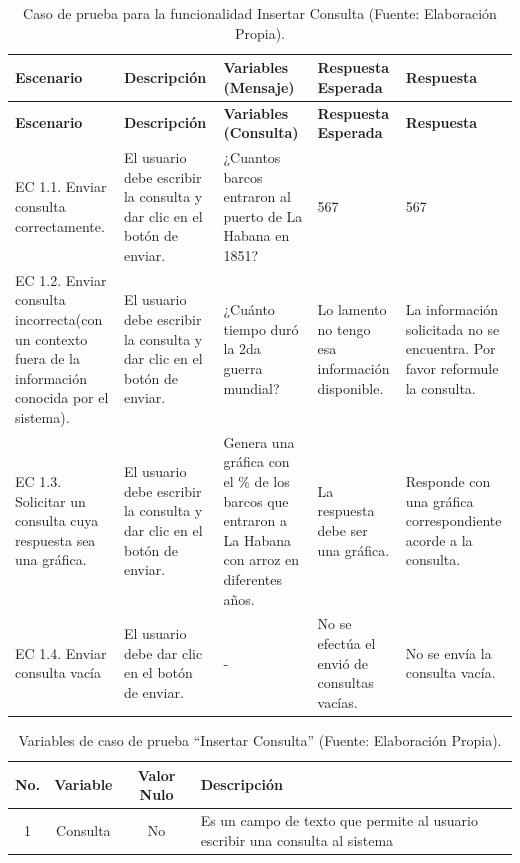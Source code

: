 \begin{small} 
	\begin{longtable}{|p{2.2cm}|p{3cm}|p{3.2cm}|p{3.2cm}|p{3.2cm}|}
		\caption{Caso de prueba para la funcionalidad Insertar Consulta (Fuente: Elaboración Propia).} \label{tab:caso_prueba_enviar_consulta} \\
		\hline
		\textbf{Escenario} & \textbf{Descripción} & \textbf{Variables (Mensaje)} & \textbf{Respuesta Esperada} & \textbf{Respuesta} \\
		\hline
		\endfirsthead
		
		\hline
		\textbf{Escenario} & \textbf{Descripción} & \textbf{Variables (Consulta)} & \textbf{Respuesta Esperada} & \textbf{Respuesta} \\
		\hline
		\endhead
		
		\hline
		\endfoot
		
		\hline
		\endlastfoot
		
		EC 1.1. Enviar consulta correctamente. & El usuario debe escribir la consulta y dar clic en el botón de enviar. & ¿Cuantos barcos entraron al puerto de La Habana en 1851? & 567 & 567 \\
		\hline
		EC 1.2. Enviar consulta incorrecta(con un contexto fuera de la información conocida por el sistema). & El usuario debe escribir la consulta y dar clic en el botón de enviar. & ¿Cuánto tiempo duró la 2da guerra mundial? & Lo lamento no tengo esa información disponible. & La información solicitada no se encuentra. Por favor reformule la consulta. \\
		\hline
		EC 1.3. Solicitar un consulta cuya respuesta sea una gráfica. & El usuario debe escribir la consulta y dar clic en el botón de enviar. & Genera una gráfica con el \% de los barcos que entraron a La Habana con arroz en diferentes años. & La respuesta debe ser una gráfica. & Responde con una gráfica correspondiente acorde a la consulta. \\
		\hline
		\hline
		EC 1.4. Enviar consulta vacía & El usuario debe dar clic en el botón de enviar. & - & No se efectúa el envió de consultas vacías. & No se envía la consulta vacía. \\
		\hline
		
	\end{longtable}
\end{small}

\begin{table}[H]
	\caption{Variables de caso de prueba “Insertar Consulta” (Fuente: Elaboración Propia).}
	\label{tab:variables_insertar_consulta}
	\centering
	\begin{tabular}{|c|c|c|p{8.5cm}|}
		\hline
		\textbf{No.} & \textbf{Variable} & \textbf{Valor Nulo} & \textbf{Descripción} \\
		\hline
		1 & Consulta & No & Es un campo de texto que permite al usuario escribir una consulta al sistema \\
		\hline
	\end{tabular}
	
\end{table}

